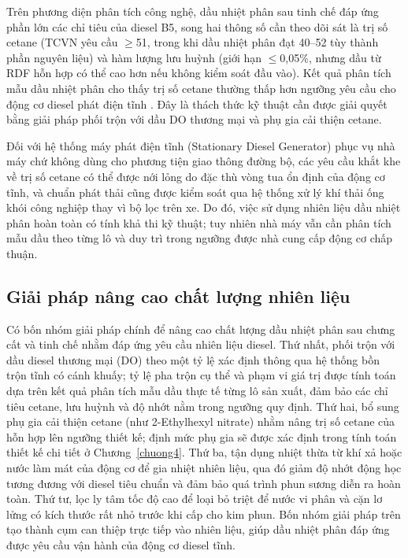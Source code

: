 \documentclass[../main.tex]{subfiles}
\begin{document}
Trên phương diện phân tích công nghệ, dầu nhiệt phân sau tinh chế đáp ứng phần lớn các chỉ tiêu của diesel B5, song hai thông số cần theo dõi sát là trị số cetane (TCVN yêu cầu $\geq$51, trong khi dầu nhiệt phân đạt 40--52 tùy thành phần nguyên liệu) và hàm lượng lưu huỳnh (giới hạn $\leq$0,05\%, nhưng dầu từ RDF hỗn hợp có thể cao hơn nếu không kiểm soát đầu vào). Kết quả phân tích mẫu dầu nhiệt phân cho thấy trị số cetane thường thấp hơn ngưỡng yêu cầu cho động cơ diesel phát điện tĩnh \cite{QUATEST2024}. Đây là thách thức kỹ thuật cần được giải quyết bằng giải pháp phối trộn với dầu DO thương mại và phụ gia cải thiện cetane.

Đối với hệ thống máy phát điện tĩnh (Stationary Diesel Generator) phục vụ nhà máy chứ không dùng cho phương tiện giao thông đường bộ, các yêu cầu khắt khe về trị số cetane có thể được nới lỏng do đặc thù vòng tua ổn định của động cơ tĩnh, và chuẩn phát thải cũng được kiểm soát qua hệ thống xử lý khí thải ống khói công nghiệp thay vì bộ lọc trên xe. Do đó, việc sử dụng nhiên liệu dầu nhiệt phân hoàn toàn có tính khả thi kỹ thuật; tuy nhiên nhà máy vẫn cần phân tích mẫu dầu theo từng lô và duy trì trong ngưỡng được nhà cung cấp động cơ chấp thuận.

\subsection{Giải pháp nâng cao chất lượng nhiên liệu}
\label{sec:giai-phap-nang-cao-chat-luong}

Có bốn nhóm giải pháp chính để nâng cao chất lượng dầu nhiệt phân sau chưng cất và tinh chế nhằm đáp ứng yêu cầu nhiên liệu diesel. Thứ nhất, phối trộn với dầu diesel thương mại (DO) theo một tỷ lệ xác định thông qua hệ thống bồn trộn tĩnh có cánh khuấy; tỷ lệ pha trộn cụ thể và phạm vi giá trị được tính toán dựa trên kết quả phân tích mẫu dầu thực tế từng lô sản xuất, đảm bảo các chỉ tiêu cetane, lưu huỳnh và độ nhớt nằm trong ngưỡng quy định. Thứ hai, bổ sung phụ gia cải thiện cetane (như 2-Ethylhexyl nitrate) nhằm nâng trị số cetane của hỗn hợp lên ngưỡng thiết kế; định mức phụ gia sẽ được xác định trong tính toán thiết kế chi tiết ở Chương~\ref{chuong4}. Thứ ba, tận dụng nhiệt thừa từ khí xả hoặc nước làm mát của động cơ để gia nhiệt nhiên liệu, qua đó giảm độ nhớt động học tương đương với diesel tiêu chuẩn và đảm bảo quá trình phun sương diễn ra hoàn toàn. Thứ tư, lọc ly tâm tốc độ cao để loại bỏ triệt để nước vi phân và cặn lơ lửng có kích thước rất nhỏ trước khi cấp cho kim phun. Bốn nhóm giải pháp trên tạo thành cụm can thiệp trực tiếp vào nhiên liệu, giúp dầu nhiệt phân đáp ứng được yêu cầu vận hành của động cơ diesel tĩnh.
\end{document}
